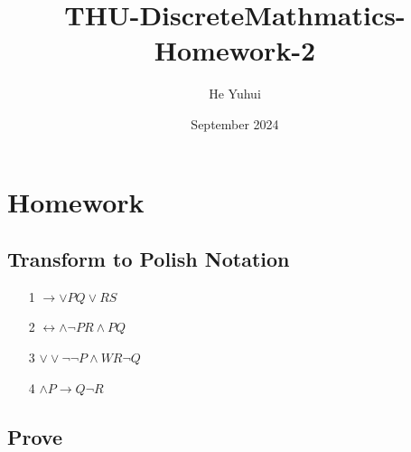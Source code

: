 \documentclass{article}
\title{THU-DiscreteMathmatics-Homework-2}
\author{He Yuhui\quad 2022012050}
\date{September 2024}
\begin{document}
\maketitle

\section{Homework}

\subsection{Transform to Polish Notation}

\begin{itemize}
    \item[1] $\to\vee PQ\vee RS$
    \item[2] $\leftrightarrow\wedge\lnot PR\wedge PQ$
    \item[3] $\vee\vee\lnot\lnot P\wedge WR\lnot Q$
    \item[4] $\wedge P\to Q\lnot R$
\end{itemize}

\subsection{Prove}
\end{document}
